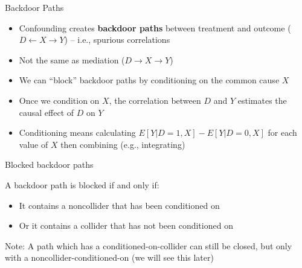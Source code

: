 \documentclass{beamer}
\begin{document}
\begin{frame}{Backdoor Paths}

  \begin{itemize}
    \item Confounding creates \textbf{backdoor paths} between treatment and outcome ($D\leftarrow X\rightarrow Y$) -- i.e., spurious correlations
    \item Not the same as mediation ($D \rightarrow X \rightarrow Y$)
    \item We can ``block'' backdoor paths by conditioning on the common cause $X$
    \item Once we condition on $X$, the correlation between $D$ and $Y$ estimates the causal effect of $D$ on $Y$
    \item Conditioning means calculating $E[Y|D=1,X]-E[Y|D=0,X]$ for each value of $X$ then combining (e.g., integrating)

  \end{itemize}

  \begin{center}
  \end{center}

\end{frame}


\begin{frame}{Blocked backdoor paths}

  A backdoor path is blocked if and only if:
  \begin{itemize}
    \item It contains a noncollider that has been conditioned on
    \item Or it contains a collider that has not been conditioned on
  \end{itemize}
  
  \bigskip
  
Note: A path which has a conditioned-on-collider can still be closed, but only with a noncollider-conditioned-on (we will see this later)

\end{frame}
\end{document}
